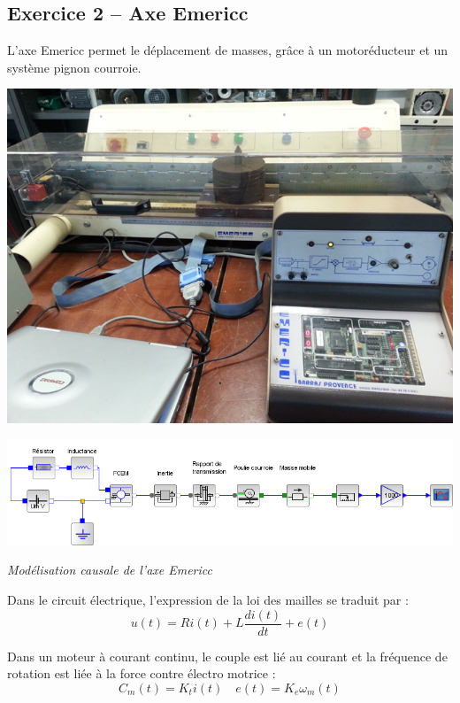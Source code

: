\documentclass[10pt]{article}
\begin{document}
\subsection*{Exercice 2 -- Axe Emericc}
L'axe Emericc permet le déplacement de masses, grâce à un motoréducteur et un système pignon courroie.
\begin{minipage}[c]{.4\linewidth}
\begin{center}
\includegraphics[width=.95\textwidth]{images/emericc}
\end{center}

\end{minipage} \hfill
\begin{minipage}[c]{.55\linewidth}
\begin{center}
\includegraphics[width=\textwidth]{images/emericc_acausal}

\textit{Modélisation causale de l'axe Emericc}
\end{center}
\end{minipage}

Dans le circuit électrique, l'expression de la loi des mailles se traduit par :
$$
u(t)= Ri(t)+L\dfrac{di(t)}{dt}+ e(t)
$$

Dans un moteur à courant continu, le couple est lié au courant et la fréquence de rotation est liée à la force contre électro motrice :
$$
C_m(t)=K_t i(t) \quad e(t)=K_e \omega_m(t)
$$
\end{document}
